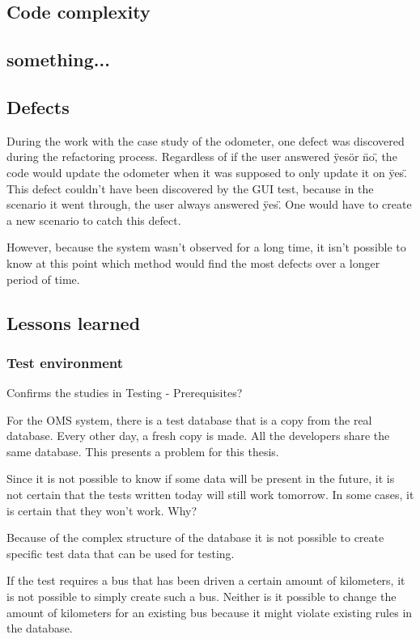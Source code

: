 \documentclass{article}
\begin{document}
		\subsection{Code complexity}
		
		\subsection{something...}

		\subsection{Defects}	
		During the work with the case study of the odometer, one defect was discovered during the refactoring process. Regardless of if the user answered \"yes\" or \"no\", the code would update the odometer when it was supposed to only update it on \"yes\". This defect couldn't have been discovered by the GUI test, because in the scenario it went through, the user always answered \"yes\". One would have to create a new scenario to catch this defect. 

		However, because the system wasn't observed for a long time, it isn't possible to know at this point which method would find the most defects over a longer period of time.

		\subsection{Lessons learned}
			\subsubsection{Test environment}

			Confirms the studies in Testing - Prerequisites?

			For the OMS system, there is a test database that is a copy from the real database. Every other day, a fresh copy is made. All the developers share the same database. This presents a problem for this thesis. 

			Since it is not possible to know if some data will be present in the future, it is not certain that the tests written today will still work tomorrow. In some cases, it is certain that they won't work. Why?

			Because of the complex structure of the database it is not possible to create specific test data that can be used for testing.

			If the test requires a bus that has been driven a certain amount of kilometers, it is not possible to simply create such a bus. Neither is it possible to change the amount of kilometers for an existing bus because it might violate existing rules in the database. 
\end{document}

